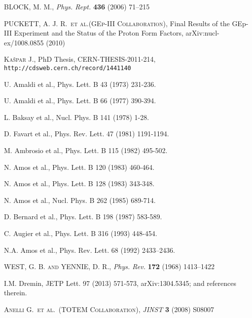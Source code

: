 \documentclass[3p,twocolumn]{elsarticle}
\def\etal{et al.}
\def\Name#1{\textsc{#1}, }
\def\REVIEW#1#2#3#4{{\it #1} {\bf #2} (#3) #4}
\begin{document}
\begin{thebibliography}{99}

	\Name{BLOCK, M. M.}
	\REVIEW{Phys. Rept.}{436}{2006}{71--215}

	\Name{PUCKETT, A. J. R.~\etal{}(GEp-III Collaboration)}
	Final Results of the GEp-III Experiment and the Status of the Proton Form Factors,
	arXiv:nucl-ex/1008.0855 (2010)

	\Name{Ka\v spar J.}
	PhD Thesis, CERN-THESIS-2011-214, {\tt http://cdsweb.cern.ch/record/1441140}

 U. Amaldi et al., Phys. Lett. B 43 (1973) 231-236.

 U. Amaldi et al., Phys. Lett. B 66 (1977) 390-394.

 L. Baksay et al., Nucl. Phys. B 141 (1978) 1-28.

 D. Favart et al., Phys. Rev. Lett. 47 (1981) 1191-1194.

 M. Ambrosio et al., Phys. Lett. B 115 (1982) 495-502.

 N. Amos et al., Phys. Lett. B 120 (1983) 460-464.

 N. Amos et al., Phys. Lett. B 128 (1983) 343-348.

 N. Amos et al., Nucl. Phys. B 262 (1985) 689-714.

 D. Bernard et al., Phys. Lett. B 198 (1987) 583-589.

 C. Augier et al., Phys. Lett. B 316 (1993) 448-454.

 N.A. Amos et al., Phys. Rev. Lett. 68 (1992) 2433–2436.


	\Name{WEST, G. B. and YENNIE, D. R.}
	\REVIEW{Phys. Rev.}{172}{1968}{1413--1422}

 I.M. Dremin, JETP Lett. 97 (2013) 571-573, arXiv:1304.5345; and references therein.

	\Name{Anelli G.~\etal{}~(TOTEM Collaboration)}
	\REVIEW{JINST}{3}{2008}{S08007}


\end{thebibliography}
\end{document}
